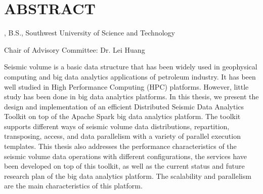 %
%
%

\chapter*{ABSTRACT}

\thispagestyle{plain} %
\setcounter{page}{3}

\begin{center}
\pvamumanuscripttitle

\pvamugradmonth \hspace{2pt} \pvamugradyear

\pvamufullname, B.S., Southwest University of Science and Technology

Chair of Advisory Committee: Dr. Lei Huang 

\par\end{center}

\indent Seismic volume is a basic data structure that has been widely used in geophysical computing and big data analytics applications of petroleum industry. It has been well studied in High Performance Computing (HPC) platforms. However, little study has been done in big data analytics platforms. In this thesis, we present the design and implementation of an efficient Distributed Seismic Data Analytics Toolkit on top of the Apache Spark big data analytics platform. The toolkit supports different ways of seismic volume data distributions, repartition, transposing, access, and data parallelism with a variety of parallel execution templates. This thesis also addresses the performance characteristics of the seismic volume data operations with different configurations, the services have been developed on top of this toolkit, as well as the current status and future research plan of the big data analytics platform. The scalability and parallelism are the main characteristics of this platform.


 

\pagebreak{}
